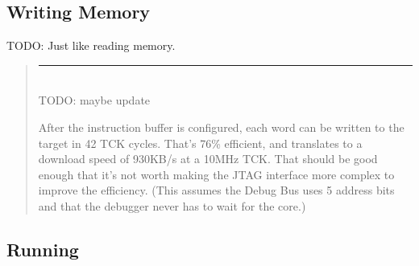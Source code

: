 \documentclass{article}
\newenvironment{commentary}
{
   \begin{quotation}
   \noindent
   \small \em
   \rule{\linewidth}{1pt}\\
}
{
   \end{quotation}
}
\begin{document}
\begin{table}[htp]
\begin{tabulary}{\textwidth}{|r|l|L|}
        \hline
    \end{tabulary}
\end{table}

\subsection{Writing Memory} \label{writemem}

TODO: Just like reading memory.

\begin{commentary}

    TODO: maybe update

    After the instruction buffer is configured, each word can be written to the
    target in 42 TCK cycles. That's 76\% efficient, and translates to a
    download speed of 930KB/s at a 10MHz TCK.  That should be good enough that
    it's not worth making the JTAG interface more complex to improve the
    efficiency. (This assumes the Debug Bus uses 5 address bits and that the
    debugger never has to wait for the core.)
\end{commentary}

\subsection{Running}
\end{document}

